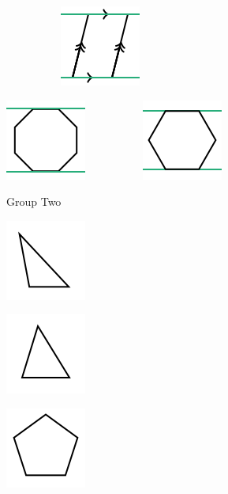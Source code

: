 \documentclass[twocolumn,10pt]{article}
\def\shrinkfactor{0.55}
\begin{document}
$\phantom{xxxxxxxx}$
\includegraphics[scale=\shrinkfactor]{figures/dc97e97ad57144cae5a8b5bfdc5d541d8d66aa00.png}

\includegraphics[scale=\shrinkfactor]{figures/f73cb50d59bdab17965cbcf6a6832a26002948cb.png}  
$\phantom{xxxxxxxx}$
\includegraphics[scale=\shrinkfactor]{figures/a8914ec8b688d03af4fc47bdfdb83edcce453d65.png}

Group Two


\includegraphics[scale=\shrinkfactor]{figures/2d844a51b839d81f30ea0fd7869869c78159abd0.png}

\includegraphics[scale=\shrinkfactor]{figures/ee7f87a00acb47dec4f2b2eed9a6741b21afc47d.png}

\includegraphics[scale=\shrinkfactor]{figures/498a6b09730fdba2360826c138eeee142e8cccc1.png}
\end{document}

